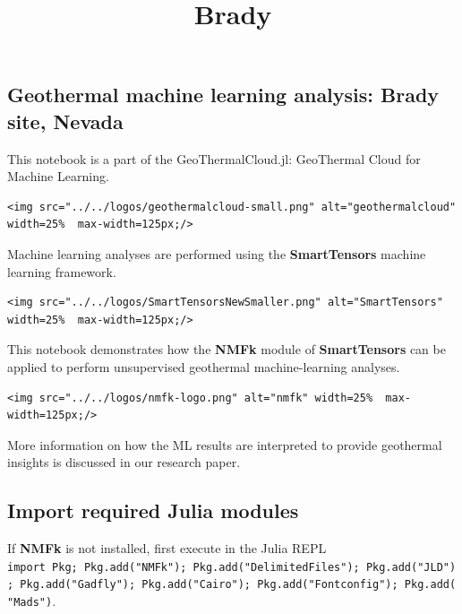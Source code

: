 \documentclass[11pt]{article}
\title{Brady}
\begin{document}
    \maketitle




    \hypertarget{geothermal-machine-learning-analysis-brady-site-nevada}{%
\subsection{Geothermal machine learning analysis: Brady site,
Nevada}\label{geothermal-machine-learning-analysis-brady-site-nevada}}

This notebook is a part of the GeoThermalCloud.jl: GeoThermal Cloud for Machine
Learning.

\begin{verbatim}
<img src="../../logos/geothermalcloud-small.png" alt="geothermalcloud" width=25%  max-width=125px;/>
\end{verbatim}

Machine learning analyses are performed using the \textbf{SmartTensors}
machine learning framework.

\begin{verbatim}
<img src="../../logos/SmartTensorsNewSmaller.png" alt="SmartTensors" width=25%  max-width=125px;/>
\end{verbatim}

This notebook demonstrates how the \textbf{NMFk} module of
\textbf{SmartTensors} can be applied to perform unsupervised geothermal
machine-learning analyses.

\begin{verbatim}
<img src="../../logos/nmfk-logo.png" alt="nmfk" width=25%  max-width=125px;/>
\end{verbatim}

More information on how the ML results are interpreted to provide
geothermal insights is discussed in our research paper.

    \hypertarget{import-required-julia-modules}{%
\subsection{Import required Julia
modules}\label{import-required-julia-modules}}

If \textbf{NMFk} is not installed, first execute in the Julia REPL
\texttt{import\ Pkg;\ Pkg.add("NMFk");\ Pkg.add("DelimitedFiles");\ Pkg.add("JLD");\ Pkg.add("Gadfly");\ Pkg.add("Cairo");\ Pkg.add("Fontconfig");\ Pkg.add("Mads")}.
\end{document}
